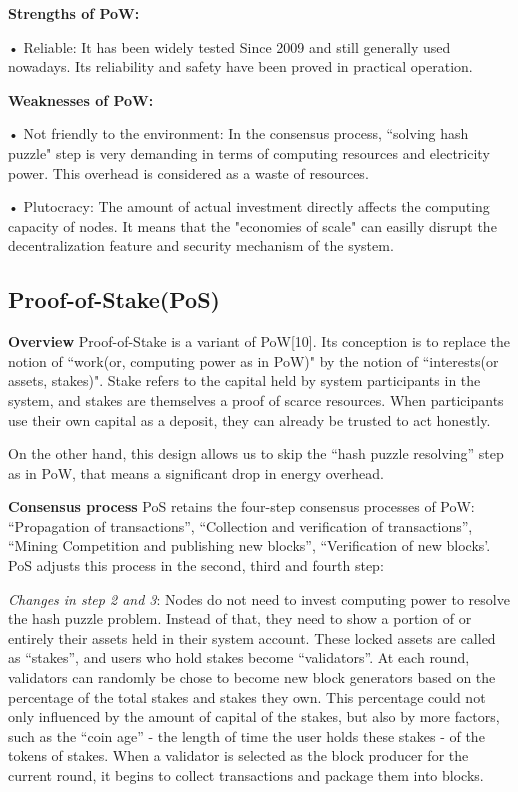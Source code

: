 \documentclass[doublespacing]{bmcart}
\begin{document}
\begin{CJK*}{UTF8}{gbsn}
	\textbf {Strengths of PoW:}
   \par • Reliable: It has been widely tested Since 2009 and still generally used nowadays. Its reliability and safety have been proved in practical operation.
   
   \textbf{Weaknesses of PoW:}
    \par • Not friendly to the environment: In the consensus process, ``solving hash puzzle" step is very demanding in terms of computing resources and electricity power. This overhead is considered as a waste of resources.
\par • Plutocracy: The amount of actual investment directly affects the computing capacity of nodes. It means that the "economies of scale" can easilly disrupt the decentralization feature and security mechanism of the system. 

	\subsection{\textbf{Proof-of-Stake(PoS)}} 
	\textbf{Overview}
	Proof-of-Stake is a variant of PoW[10]. Its conception is to replace the notion of ``work(or, computing power as in PoW)" by the notion of ``interests(or assets, stakes)". Stake refers to the capital held by system participants in the system, and stakes are themselves a proof of scarce resources. When participants use their own capital as a deposit, they can already be trusted to act honestly.
	
	On the other hand, this design allows us to skip the ``hash puzzle resolving'' step as in PoW, that means a significant drop in energy overhead.
	
	\textbf{Consensus process}	
	PoS retains the four-step consensus processes of PoW: ``Propagation of transactions'', ``Collection and verification of transactions'', ``Mining Competition and publishing new blocks'', ``Verification of new blocks'. PoS adjusts this process in the second, third and fourth step:
	
	\textsl{Changes in step 2 and 3}: Nodes do not need to invest computing power to resolve the hash puzzle problem. Instead of that, they need to show a portion of or entirely their assets held in their system account. These locked assets are called as ``stakes'', and users who hold stakes become ``validators''. At each round, validators can randomly be chose to become new block generators based on the percentage of the total stakes and stakes they own. This percentage could not only influenced by the amount of capital of the stakes, but also by more factors, such as the ``coin age'' - the length of time the user holds these stakes - of the tokens of stakes. When a validator is selected as the block producer for the current round, it begins to collect transactions and package them into blocks.
	

\end{CJK*}
\end{document}
